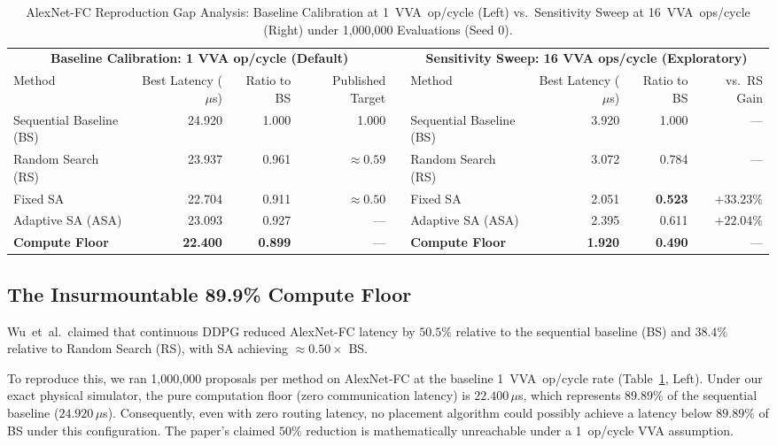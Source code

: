 \documentclass[10pt,conference]{IEEEtran}
\begin{document}
\begin{table}[t]
  \caption{AlexNet-FC Reproduction Gap Analysis: Baseline Calibration at 1~VVA~op/cycle (Left) vs.\ Sensitivity Sweep at 16~VVA~ops/cycle (Right) under 1,000,000 Evaluations (Seed 0).}
  \label{tab:repro-gap-combined}
  \centering
  \small
  \begin{tabular}{lrrr c lrrr}
    \toprule
    \multicolumn{4}{c}{\textbf{Baseline Calibration: 1 VVA op/cycle (Default)}} & \quad & \multicolumn{4}{c}{\textbf{Sensitivity Sweep: 16 VVA ops/cycle (Exploratory)}} \\
    \cmidrule(r){1-4} \cmidrule(l){6-9}
    Method & Best Latency ($\mu$s) & Ratio to BS & Published Target & & Method & Best Latency ($\mu$s) & Ratio to BS & vs.\ RS Gain \\
    \midrule
    Sequential Baseline (BS) & 24.920 & 1.000 & 1.000 & & Sequential Baseline (BS) & 3.920 & 1.000 & --- \\
    Random Search (RS)       & 23.937 & 0.961 & ${\approx}0.59$ & & Random Search (RS)       & 3.072 & 0.784 & --- \\
    Fixed SA                 & 22.704 & 0.911 & ${\approx}0.50$ & & Fixed SA                 & 2.051 & \textbf{0.523} & $\mathbf{+33.23\%}$ \\
    Adaptive SA (ASA)        & 23.093 & 0.927 & --- & & Adaptive SA (ASA)        & 2.395 & 0.611 & $+22.04\%$ \\
    \midrule
    \textbf{Compute Floor}   & \textbf{22.400} & \textbf{0.899} & --- & & \textbf{Compute Floor}   & \textbf{1.920} & \textbf{0.490} & --- \\
    \bottomrule
  \end{tabular}
\end{table}

\subsection{The Insurmountable 89.9\% Compute Floor}
Wu~et~al.\ claimed that continuous DDPG reduced AlexNet-FC latency by $50.5\%$ relative to the sequential baseline (BS) and $38.4\%$ relative to Random Search (RS), with SA achieving ${\approx}0.50 \times$ BS.

To reproduce this, we ran 1,000,000 proposals per method on AlexNet-FC at the baseline 1~VVA~op/cycle rate (Table~\ref{tab:repro-gap-combined}, Left). Under our exact physical simulator, the pure computation floor (zero communication latency) is $22.400\,\mu$s, which represents $\mathbf{89.89\%}$ of the sequential baseline ($24.920\,\mu$s). Consequently, even with zero routing latency, no placement algorithm could possibly achieve a latency below $89.89\%$ of BS under this configuration. The paper's claimed $50\%$ reduction is mathematically unreachable under a 1~op/cycle VVA assumption.
\end{document}
